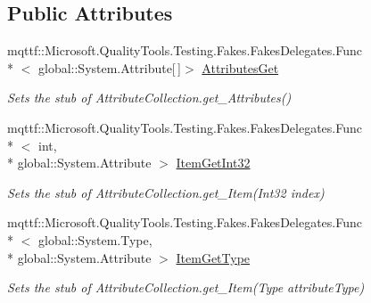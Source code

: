 \subsection*{Public Attributes}
\begin{DoxyCompactItemize}
\item 
mqttf\-::\-Microsoft.\-Quality\-Tools.\-Testing.\-Fakes.\-Fakes\-Delegates.\-Func\\*
$<$ global\-::\-System.\-Attribute\mbox{[}$\,$\mbox{]}$>$ \hyperlink{class_system_1_1_component_model_1_1_fakes_1_1_stub_attribute_collection_aaac4d775b4f40fcbca96c51694a8c812}{Attributes\-Get}
\begin{DoxyCompactList}\small\item\em Sets the stub of Attribute\-Collection.\-get\-\_\-\-Attributes()\end{DoxyCompactList}\item 
mqttf\-::\-Microsoft.\-Quality\-Tools.\-Testing.\-Fakes.\-Fakes\-Delegates.\-Func\\*
$<$ int, \\*
global\-::\-System.\-Attribute $>$ \hyperlink{class_system_1_1_component_model_1_1_fakes_1_1_stub_attribute_collection_a1e97f26fb9e11cf6d8d86fcb621b2d05}{Item\-Get\-Int32}
\begin{DoxyCompactList}\small\item\em Sets the stub of Attribute\-Collection.\-get\-\_\-\-Item(\-Int32 index)\end{DoxyCompactList}\item 
mqttf\-::\-Microsoft.\-Quality\-Tools.\-Testing.\-Fakes.\-Fakes\-Delegates.\-Func\\*
$<$ global\-::\-System.\-Type, \\*
global\-::\-System.\-Attribute $>$ \hyperlink{class_system_1_1_component_model_1_1_fakes_1_1_stub_attribute_collection_af7370b1eb09e88387f61a3721a208ae8}{Item\-Get\-Type}
\begin{DoxyCompactList}\small\item\em Sets the stub of Attribute\-Collection.\-get\-\_\-\-Item(\-Type attribute\-Type)\end{DoxyCompactList}\end{DoxyCompactItemize}
